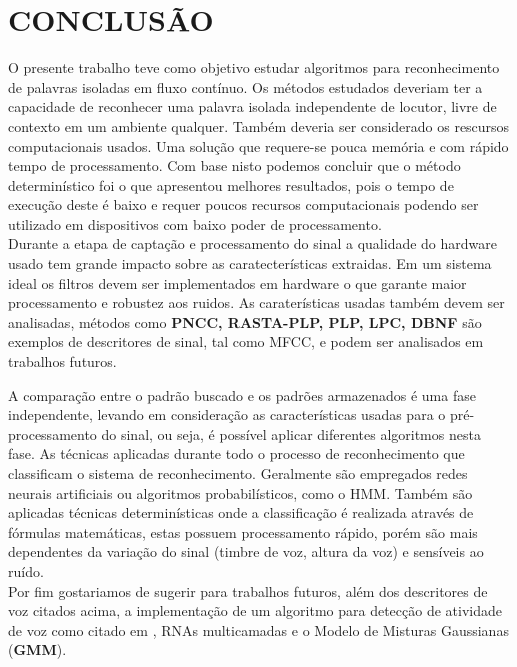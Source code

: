 \chapter{CONCLUSÃO}
\thispagestyle{plain}
\label{chap:conc}
\quad O presente trabalho teve como objetivo estudar algoritmos para reconhecimento de palavras isoladas em fluxo contínuo. Os métodos estudados deveriam ter a capacidade de reconhecer  uma palavra isolada independente de locutor, livre de contexto em um ambiente qualquer. Também deveria ser considerado os rescursos computacionais usados. Uma solução que requere-se pouca memória e com rápido tempo de processamento. Com base nisto podemos concluir que o método determinístico foi o que apresentou melhores resultados, pois o tempo de execução deste é baixo e requer poucos recursos computacionais podendo ser utilizado em
dispositivos com baixo poder de processamento.\\

Durante a etapa de captação e processamento do sinal a qualidade do hardware usado tem grande impacto sobre as caratecterísticas extraidas. Em um sistema ideal os filtros devem ser implementados em hardware o que garante maior processamento e robustez aos ruidos. As caraterísticas usadas também devem ser analisadas, métodos como \textbf{PNCC, RASTA-PLP, PLP, LPC, DBNF} são exemplos de descritores de sinal, tal como MFCC, e podem ser analisados em trabalhos futuros.

\quad A comparação entre o padrão buscado e os padrões armazenados é uma fase independente, levando em consideração as 
características usadas para o pré-processamento do sinal, ou seja, é possível aplicar diferentes algoritmos nesta fase. As técnicas 
aplicadas durante todo o processo de reconhecimento que classificam o sistema de reconhecimento. Geralmente são empregados redes neurais artificiais ou  algoritmos probabilísticos, como o HMM. Também são aplicadas técnicas determinísticas onde a  classificação é realizada através de  fórmulas matemáticas, estas possuem processamento rápido, porém são mais dependentes da variação do sinal (timbre de voz, altura da voz) e sensíveis ao ruído.\\

\quad Por fim gostariamos de sugerir para trabalhos futuros, além dos  descritores de voz citados acima, a implementação de um algoritmo para detecção de atividade de voz como citado em \cite{vad}, RNAs multicamadas e o Modelo de Misturas Gaussianas (\textbf{GMM}).